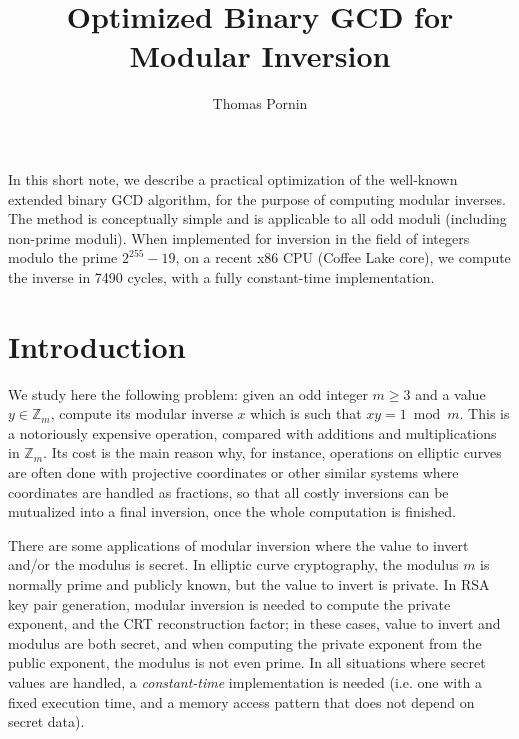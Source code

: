 \documentclass{llncs}
\makeatletter
\renewenvironment{abstract}{%
      \list{}{\advance\topsep by0.35cm\relax\small
      \leftmargin=1cm
      \labelwidth=\z@
      \listparindent=\z@
      \itemindent\listparindent
      \rightmargin\leftmargin}\item[\hskip\labelsep
                                    \textsf{\textbf{\abstractname}}]}
    {\endlist}
\newcommand{\bZ}{\mathbb{Z}}
\makeatother
\begin{document}
\title{\textsf{Optimized Binary GCD for Modular Inversion}}

\author{Thomas Pornin}

\maketitle
\noindent{} %

\begin{abstract}
In this short note, we describe a practical optimization of the
well-known extended binary GCD algorithm, for the purpose of computing
modular inverses. The method is conceptually simple and is applicable
to all odd moduli (including non-prime moduli). When implemented
for inversion in the field of integers modulo the prime $2^{255}-19$, on
a recent x86 CPU (Coffee Lake core), we compute the inverse in 7490
cycles, with a fully constant-time implementation.
\end{abstract}

\section{Introduction}\label{sec:intro}

We study here the following problem: given an odd integer $m \geq 3$ and
a value $y \in \bZ_m$, compute its modular inverse $x$ which is such
that $xy = 1 \bmod m$. This is a notoriously expensive operation,
compared with additions and multiplications in $\bZ_m$. Its cost is the
main reason why, for instance, operations on elliptic curves are often
done with projective coordinates or other similar systems where
coordinates are handled as fractions, so that all costly inversions can
be mutualized into a final inversion, once the whole computation is
finished.

There are some applications of modular inversion where the value to
invert and/or the modulus is secret. In elliptic curve cryptography, the
modulus $m$ is normally prime and publicly known, but the value to
invert is private. In RSA key pair generation, modular inversion is
needed to compute the private exponent, and the CRT reconstruction
factor; in these cases, value to invert and modulus are both secret, and
when computing the private exponent from the public exponent, the
modulus is not even prime. In all situations where secret values are
handled, a \emph{constant-time} implementation is needed (i.e. one with
a fixed execution time, and a memory access pattern that does not depend
on secret data).
\end{document}
